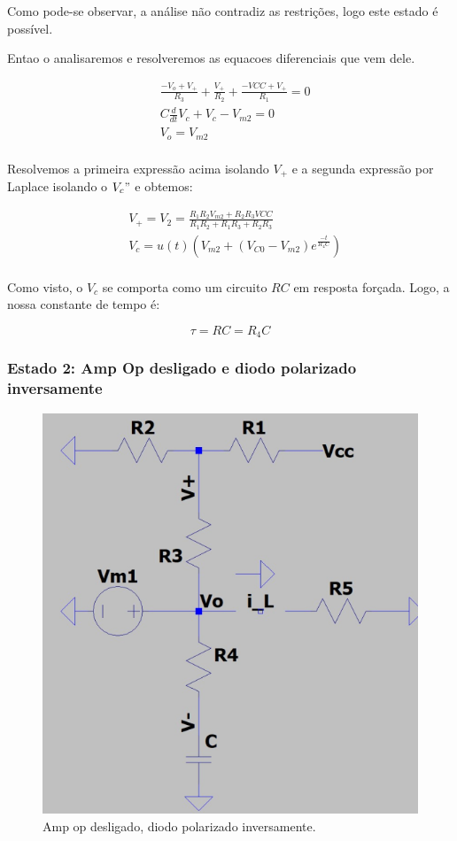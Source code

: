 Como pode-se observar, a análise não contradiz as restrições, logo este estado é possível.

Entao o analisaremos e resolveremos as equacoes diferenciais que vem dele.

\begin{equation}
    \begin{aligned}
         & \frac{- V_{o} + V_{+}}{R_{3}} + \frac{V_{+}}{R_{2}} + \frac{- VCC + V_{+}}{R_{1}} = 0 \\
         & C \frac{d}{d t} V_{c} + V_{c} - V_{m2} = 0                                            \\
         & V_{o} = V_{m2}                                                                        \\
    \end{aligned}
\end{equation}

Resolvemos a primeira expressão acima isolando $V_{+}$ e a segunda expressão por Laplace isolando o $V_c"$ e obtemos:

\begin{equation}
    \begin{aligned}
         & V_{+} = V_2 = \frac{R_{1} R_{2} V_{m2} + R_{2} R_{3} VCC}{R_{1} R_{2} + R_{1} R_{3} + R_{2} R_{3}} \\
         & V_c = u(t) \left( V_{m2} + (V_{C0} - V_{m2}) e^{\frac{-t}{R_4 C}} \right)                          \\
    \end{aligned}
\end{equation}

Como visto, o $V_c$ se comporta como um circuito $RC$ em resposta forçada. Logo, a nossa constante de tempo é:

\begin{equation}
    \tau = R C = R_4 C
\end{equation}

\subsubsection{Estado 2: Amp Op desligado e diodo polarizado inversamente}

\begin{figure}[H]
    \centering
    \includegraphics[width=0.5\columnwidth]{images/ampop2diodo2.png}
    \caption{Amp op desligado, diodo polarizado inversamente.}
\end{figure}

